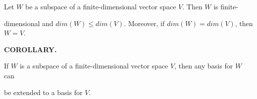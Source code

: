 \documentclass[12pt, a4paper]{article}
\begin{document}
  \vspace{2mm}
  
  Let $W$ be a subspace of a finite-dimensional vector space $V$. Then $W$ is finite-\par dimensional and $dim(W)\leq dim(V)$. Moreover, if $dim(W)=dim(V)$, then $W=V$.
  
  \vspace{4mm}
  
  \noindent\blacktriangle\textbf{ COROLLARY.}
  
  \vspace{2mm}
  
  If $W$ is a subspace of a finite-dimensional vector space $V$, then any basis for $W$ can\par be extended to a basis for $V$.
 
 
 
 
 
 
\end{document}
